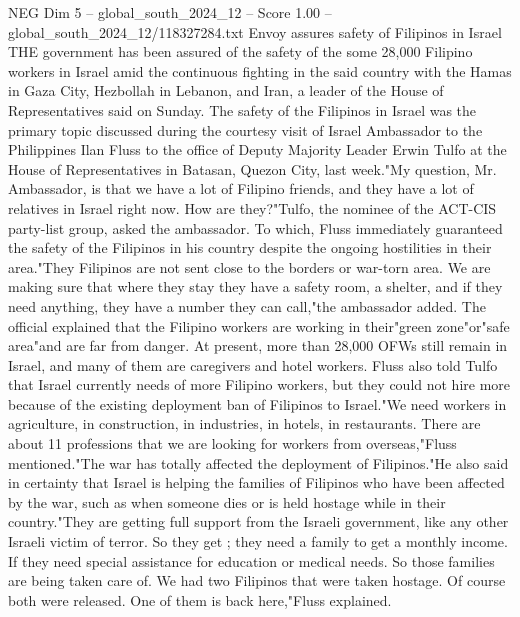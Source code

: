 \begin{textsample}{NEG Dim 5 – global\_south\_2024\_12 – Score 1.00 – global\_south\_2024\_12/118327284.txt}  \label{ex:f5_neg_405}
Envoy assures safety of Filipinos in Israel THE government has been assured of the safety of the some 28,000 Filipino workers in Israel amid the continuous fighting in the said country with the Hamas in Gaza City, Hezbollah in Lebanon, and Iran, a leader of the House of Representatives said on Sunday.
The safety of the Filipinos in Israel was the primary topic discussed during the courtesy visit of Israel Ambassador to the Philippines Ilan Fluss to the office of Deputy Majority Leader Erwin Tulfo at the House of Representatives in Batasan, Quezon City, last week."My question, Mr.
Ambassador, is that we have a lot of Filipino friends, and they have a lot of relatives in Israel right now.
How are they?"Tulfo, the nominee of the ACT-CIS party-list group, asked the ambassador.
To which, Fluss immediately guaranteed the safety of the Filipinos in his country despite the ongoing hostilities in their area."They Filipinos are not sent close to the borders or war-torn area.
We are making sure that where they stay they have a safety room, a shelter, and if they need anything, they have a number they can call,"the ambassador added.
The official explained that the Filipino workers are working in their"green zone"or"safe area"and are far from danger.
At present, more than 28,000 OFWs still remain in Israel, and many of them are caregivers and hotel workers.
Fluss also told Tulfo that Israel currently needs of more Filipino workers, but they could not hire more because of the existing deployment ban of Filipinos to Israel."We need workers in agriculture, in construction, in industries, in hotels, in restaurants.
There are about 11 professions that we are looking for workers from overseas,"Fluss mentioned."The war has totally affected the deployment of Filipinos."He also said in certainty that Israel is helping the families of Filipinos who have been affected by the war, such as when someone dies or is held hostage while in their country."They are getting full support from the Israeli government, like any other Israeli victim of terror.
So they get ; they need a family to get a monthly income.
If they need special assistance for education or medical needs.
So those families are being taken care of.
We had two Filipinos that were taken hostage.
Of course both were released.
One of them is back here,"Fluss explained.

\end{textsample}
